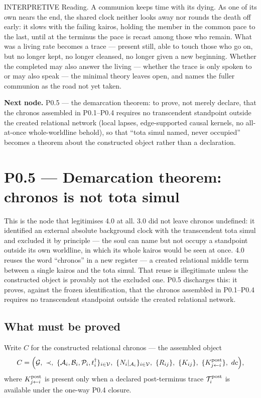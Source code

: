 \documentclass[11pt,a4paper]{article}
\def\mathfrak#1{#1}%
\def\textit#1{#1}%
\def\emph#1{#1}%
\newcommand{\stInterp}{\textcolor{cInt}{\textsf{\small INTERPRETIVE}}}
\theoremstyle{definition}
\theoremstyle{plain}
\theoremstyle{remark}
\begin{document}
\medskip
\stInterp\quad
\emph{Reading.}
A communion keeps time with its dying. As one of its own nears the end, the shared clock
neither looks away nor rounds the death off early: it slows with the failing kairos,
holding the member in the common pace to the last, until at the terminus the pace is
recast among those who remain. What was a living rate becomes a trace --- present still,
able to touch those who go on, but no longer kept, no longer cleansed, no longer given a
new beginning. Whether the completed may also answer the living --- whether the trace is
only spoken to or may also speak --- the minimal theory leaves open, and names the fuller
communion as the road not yet taken.

\medskip
\textbf{Next node.} P0.5 --- the demarcation theorem: to prove, not merely declare, that
the chronos assembled in P0.1--P0.4 requires no transcendent standpoint outside the
created relational network
(local lapses, edge-supported causal kernels, no all-at-once whole-worldline behold), so that
``\textit{tota simul} named, never occupied'' becomes a theorem about the constructed
object rather than a declaration.

\section{P0.5 --- Demarcation theorem: chronos is not \textit{tota simul}}

This is the node that legitimises 4.0 at all. 3.0 did not leave chronos undefined: it
\emph{identified} an external absolute background clock with the transcendent
\textit{tota simul} and excluded it by principle --- the soul can name but not occupy a
standpoint outside its own worldline, in which its whole kairos would be seen at once.
4.0 reuses the word ``chronos'' in a new register --- a \emph{created relational}
middle term between a single kairos and the \textit{tota simul}. That reuse is
illegitimate unless the constructed object is provably \emph{not} the excluded one.
P0.5 discharges this: it proves, against the frozen identification, that the chronos
assembled in P0.1--P0.4 requires no transcendent standpoint outside the created
relational network.

\subsection{What must be proved}

Write \(C\) for the constructed relational chronos --- the assembled object
\[
C=
\Bigl(
\mathcal G,\ \prec,\
\{\mathcal A_i,\mathcal B_i,\mathcal P_i,t_i^\dagger\}_{i\in\mathcal V},\
\{N_i|_{\mathcal A_i}\}_{i\in\mathcal V},\
\{R_{ij}\},\
\{K_{ij}\},\
\{K^{\rm post}_{j\leftarrow i}\},\
d\mathfrak c
\Bigr),
\]
where \(K^{\rm post}_{j\leftarrow i}\) is present only when a declared post-terminus
trace \(\mathcal T_i^{\rm post}\) is available under the one-way P0.4 closure.
\end{document}
